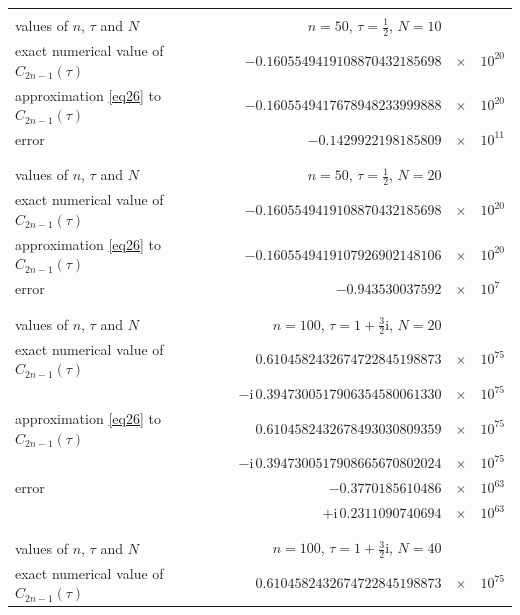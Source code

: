 \documentclass[pdftex]{sigma}
\def\im{\mathrm{i}}
\numberwithin{equation}{section}
\begin{document}
\begin{table}[!ht]\centering
\begin{tabular}
[c]{ l r @{\,}c@{\,} l}\hline
 & \\ [-1.5ex]
 values of $n$, $\tau$ and $N$ & $n=50$, $\tau=\frac{1}{2}$, $N=10$ & & \\ [0.5ex]
 exact numerical value of $C_{2n-1}(\tau)\qquad$ & $-0.1605549419108870432185698$ & $\times$ & $10^{20}$ \\ [0.5ex]
 approximation \eqref{eq26} to $C_{2n-1}(\tau)$ & $-0.1605549417678948233999888$ & $\times$ & $10^{20}$ \\ [0.5ex]
 error & $-0.1429922198185809$ & $\times$ & $10^{11}$\\ [-1.5ex]
 & \\\hline
& \\ [-1.5ex]
 values of $n$, $\tau$ and $N$ & $n=50$, $\tau=\frac{1}{2}$, $N=20$ & & \\ [0.5ex]
 exact numerical value of $C_{2n-1}(\tau)$ & $-0.1605549419108870432185698$ & $\times$ & $10^{20}$ \\ [0.5ex]
 approximation \eqref{eq26} to $C_{2n-1}(\tau)$ & $-0.1605549419107926902148106$ & $\times$ & $10^{20}$ \\ [0.5ex]
 error & $-0.943530037592$ & $\times$ & $10^{7}$\\ [-1.5ex]
 & \\\hline
& \\ [-1.5ex]
 values of $n$, $\tau$ and $N$ & $n=100$, $\tau=1+\frac{3}{2}\im$, $N=20$ & & \\ [0.5ex]
 exact numerical value of $C_{2n-1}(\tau)$ & $0.6104582432674722845198873$ & $\times$ & $10^{75}$ \\ [0.1ex]
 & $-\im\, 0.3947300517906354580061330$ & $\times$ & $10^{75}$ \\ [0.5ex]
 approximation \eqref{eq26} to $C_{2n-1}(\tau)$ & $0.6104582432678493030809359$ & $\times$ & $10^{75}$ \\ [0.1ex]
 & $-\im\, 0.3947300517908665670802024$ & $\times$ & $10^{75}$ \\ [0.5ex]
 error & $-0.3770185610486$ & $\times$ & $10^{63}$\\ [0.1ex]
& $+\im\, 0.2311090740694$ & $\times$ & $10^{63}$ \\ [-1.5ex]
 & \\\hline
& \\ [-1.5ex]
 values of $n$, $\tau$ and $N$ & $n=100$, $\tau=1+\frac{3}{2}\im$, $N=40$ & & \\ [0.5ex]
 exact numerical value of $C_{2n-1}(\tau)$ & $0.6104582432674722845198873$ & $\times$ & $10^{75}$ \\ [0.1ex]

\end{tabular}
\end{table}
\end{document}
